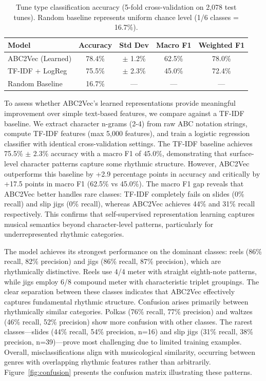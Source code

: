\documentclass[]{interact}
\theoremstyle{plain}
\theoremstyle{definition}
\theoremstyle{remark}
\begin{document}
\begin{table}[!htb]
\centering
\caption{Tune type classification accuracy (5-fold cross-validation on 2,078 test tunes). Random baseline represents uniform chance level (1/6 classes = 16.7\%).}
\label{tab:tune_type}
\begin{tabular}{lcccc}
\toprule
\textbf{Model} & \textbf{Accuracy} & \textbf{Std Dev} & \textbf{Macro F1} & \textbf{Weighted F1} \\
\midrule
ABC2Vec (Learned) & 78.4\% & $\pm$ 1.2\% & 62.5\% & 78.0\% \\
TF-IDF + LogReg & 75.5\% & $\pm$ 2.3\% & 45.0\% & 72.4\% \\
Random Baseline & 16.7\% & --- & --- & --- \\
\bottomrule
\end{tabular}
\end{table}

To assess whether ABC2Vec's learned representations provide meaningful improvement over simple text-based features, we compare against a TF-IDF baseline. We extract character n-grams (2-4) from raw ABC notation strings, compute TF-IDF features (max 5,000 features), and train a logistic regression classifier with identical cross-validation settings. The TF-IDF baseline achieves 75.5\% $\pm$ 2.3\% accuracy with a macro F1 of 45.0\%, demonstrating that surface-level character patterns capture some rhythmic structure. However, ABC2Vec outperforms this baseline by +2.9 percentage points in accuracy and critically by +17.5 points in macro F1 (62.5\% vs 45.0\%). The macro F1 gap reveals that ABC2Vec better handles rare classes: TF-IDF completely fails on slides (0\% recall) and slip jigs (0\% recall), whereas ABC2Vec achieves 44\% and 31\% recall respectively. This confirms that self-supervised representation learning captures musical semantics beyond character-level patterns, particularly for underrepresented rhythmic categories.

The model achieves its strongest performance on the dominant classes: reels (86\% recall, 82\% precision) and jigs (86\% recall, 87\% precision), which are rhythmically distinctive. Reels use 4/4 meter with straight eighth-note patterns, while jigs employ 6/8 compound meter with characteristic triplet groupings. The clear separation between these classes indicates that ABC2Vec effectively captures fundamental rhythmic structure. Confusion arises primarily between rhythmically similar categories. Polkas (76\% recall, 77\% precision) and waltzes (46\% recall, 52\% precision) show more confusion with other classes. The rarest classes—slides (44\% recall, 54\% precision, n=16) and slip jigs (31\% recall, 38\% precision, n=39)—prove most challenging due to limited training examples. Overall, misclassifications align with musicological similarity, occurring between genres with overlapping rhythmic features rather than arbitrarily. Figure~\ref{fig:confusion} presents the confusion matrix illustrating these patterns.
\end{document}
